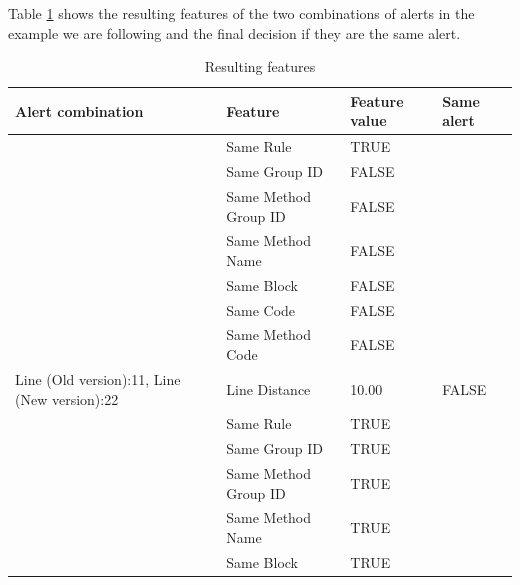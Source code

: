 \documentclass[
]{article}
\begin{document}
\begin{itemize}
\normalsize


%
%
%

Table \ref{table_features_with_decision} shows the resulting features of the two combinations of alerts in the example we are following and the final decision if they are the same alert.


\small
\begin{table}[H]
\caption{\label{tab:unnamed-chunk-14}Resulting features\label{table_features_with_decision} }
\centering
\begin{tabular}[t]{l|l|l|l}
\hline
Alert combination & Feature & Feature value & Same alert\\
\hline
\rowcolor{gray!6}  \rowcolor{gray!6}   & Same Rule & TRUE & \\

 & Same Group ID & FALSE & \\

\rowcolor{gray!6}   & Same Method Group ID & FALSE & \\

 & Same Method Name & FALSE & \\

\rowcolor{gray!6}   & Same Block & FALSE & \\

 & Same Code & FALSE & \\

\rowcolor{gray!6}   & Same Method Code & FALSE & \\

\multirow[t]{-8}{*}{\raggedright\arraybackslash Line (Old version):11, Line (New version):22} & Line Distance & 10.00 & \multirow[t]{-8}{*}{\raggedright\arraybackslash FALSE}\\
\cline{1-4}
 & Same Rule & TRUE & \\

 & Same Group ID & TRUE & \\

\rowcolor{gray!6}   & Same Method Group ID & TRUE & \\

 & Same Method Name & TRUE & \\

\rowcolor{gray!6}   & Same Block & TRUE & \\


\end{tabular}
\end{table}
\end{itemize}
\end{document}
